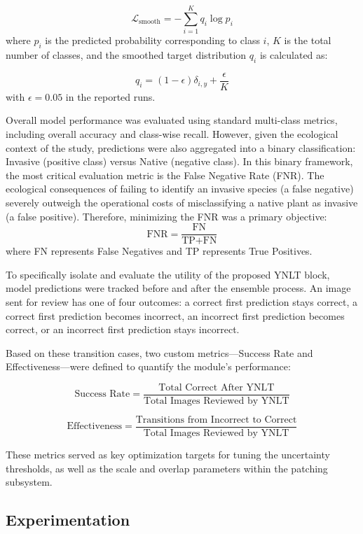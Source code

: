 \documentclass[final,3p,times,twocolumn]{elsarticle}
\begin{document}
\[
\mathcal{L}_{\text{smooth}} = - \sum_{i=1}^{K} q_i \log p_i
\]
where \( p_i \) is the predicted probability corresponding to class \( i \), \( K \) is the total number of classes, and the smoothed target distribution \( q_i \) is calculated as:

\[
 q_i = (1 - \epsilon) \delta_{i,y} + \frac{\epsilon}{K} 
\]
with \(\epsilon=0.05\) in the reported runs.

Overall model performance was evaluated using standard multi-class metrics, including overall accuracy and class-wise recall. However, given the ecological context of the study, predictions were also aggregated into a binary classification: Invasive (positive class) versus Native (negative class). In this binary framework, the most critical evaluation metric is the False Negative Rate (FNR). The ecological consequences of failing to identify an invasive species (a false negative) severely outweigh the operational costs of misclassifying a native plant as invasive (a false positive). Therefore, minimizing the FNR was a primary objective:
\[
\text{FNR} = \frac{\text{FN}}{\text{TP} + \text{FN}}
\]
where FN represents False Negatives and TP represents True Positives.

To specifically isolate and evaluate the utility of the proposed YNLT block, model predictions were tracked before and after the ensemble process. An image sent for review has one of four outcomes: a correct first prediction stays correct, a correct first prediction becomes incorrect, an incorrect first prediction becomes correct, or an incorrect first prediction stays incorrect.

Based on these transition cases, two custom metrics—Success Rate and Effectiveness—were defined to quantify the module's performance:

\[
\text{Success Rate} = \frac{\text{Total Correct After YNLT}}{\text{Total Images Reviewed by YNLT}}
\]

\[
\text{Effectiveness} = \frac{\text{Transitions from Incorrect to Correct}}{\text{Total Images Reviewed by YNLT}}
\]

These metrics served as key optimization targets for tuning the uncertainty thresholds, as well as the scale and overlap parameters within the patching subsystem.

\subsection{Experimentation}
\end{document}
